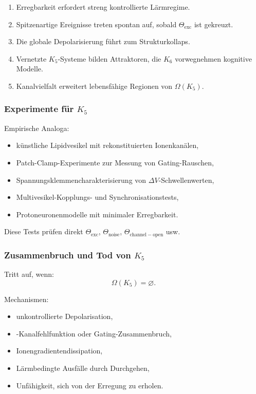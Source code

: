 \begin{enumerate}
    \item Erregbarkeit erfordert streng kontrollierte Lärmregime.
    \item Spitzenartige Ereignisse treten spontan auf, sobald $\Theta_{\mathrm{exc}}$
          ist gekreuzt.
    \item Die globale Depolarisierung führt zum Strukturkollaps.
    \item Vernetzte $K_5$-Systeme bilden Attraktoren, die $K_6$ vorwegnehmen
          kognitive Modelle.
    \item Kanalvielfalt erweitert lebensfähige Regionen von $\Omega(K_5)$.
\end{enumerate}

\subsubsection{Experimente für \texorpdfstring{$K_5$}{K_5}}

Empirische Analoga:
\begin{itemize}
    \item künstliche Lipidvesikel mit rekonstituierten Ionenkanälen,
    \item Patch-Clamp-Experimente zur Messung von Gating-Rauschen,
    \item Spannungsklemmencharakterisierung von $\Delta V$-Schwellenwerten,
    \item Multivesikel-Kopplungs- und Synchronisationstests,
    \item Protoneuronenmodelle mit minimaler Erregbarkeit.
\end{itemize}

Diese Tests prüfen direkt $\Theta_{\mathrm{exc}}$, $\Theta_{\mathrm{noise}}$,
$\Theta_{\mathrm{channel-open}}$ usw.

\subsubsection{Zusammenbruch und Tod von \texorpdfstring{$K_5$}{K_5}}

Tritt auf, wenn:
\[
\Omega(K_5) = \varnothing.
\]

Mechanismen:
\begin{itemize}
    \item unkontrollierte Depolarisation,
    \item-Kanalfehlfunktion oder Gating-Zusammenbruch,
    \item Ionengradientendissipation,
    \item Lärmbedingte Ausfälle durch Durchgehen,
    \item Unfähigkeit, sich von der Erregung zu erholen.
\end{itemize}

